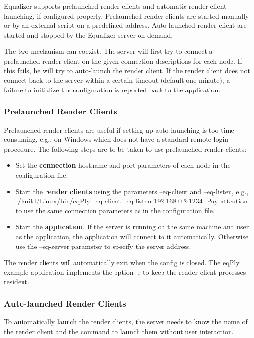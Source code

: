 \documentclass[10pt,a4]{scrartcl}
\begin{document}
Equalizer supports prelaunched render clients and automatic render client
launching, if configured properly. Prelaunched render clients are started
manually or by an external script on a predefined address. Auto-launched render
client are started and stopped by the Equalizer server on demand.

The two mechanism can coexist. The server will first try to connect a
prelaunched render client on the given connection descriptions for each
node. If this fails, he will try to auto-launch the render client. If the render
client does not connect back to the server within a certain timeout (default one
minute), a failure to initialize the configuration is reported back to the
application.

\subsubsection{Prelaunched Render Clients}
Prelaunched render clients are useful if setting up auto-launching is too
time-consuming, e.g., on Windows which does not have a standard remote login
procedure. The following steps are to be taken to use prelaunched render
clients:

\begin{itemize}
\item Set the \textbf{connection} hostname and port parameters of each node in
  the configuration file.
\item Start the \textbf{render clients} using the parameters
  \textsf{--eq-client} and \textsf{--eq-listen}, e.g.,
  \textsf{./build/Linux/bin/eqPly --eq-client --eq-listen
  192.168.0.2:1234}. Pay attention to use the same connection parameters as in
    the configuration file.
\item Start the \textbf{application}. If the server is running on the same
  machine and user as the application, the application will connect to it
  automatically. Otherwise use the \textsf{--eq-server} parameter to specify the
  server address.
\end{itemize}

The render clients will automatically exit when the config is closed. The
\textsf{eqPly} example application implements the option \textsf{-r} to keep the
render client processes resident.

\subsubsection{Auto-launched Render Clients}
To automatically launch the render clients, the server needs to know the name of
the render client and the command to launch them without user interaction.
\end{document}
